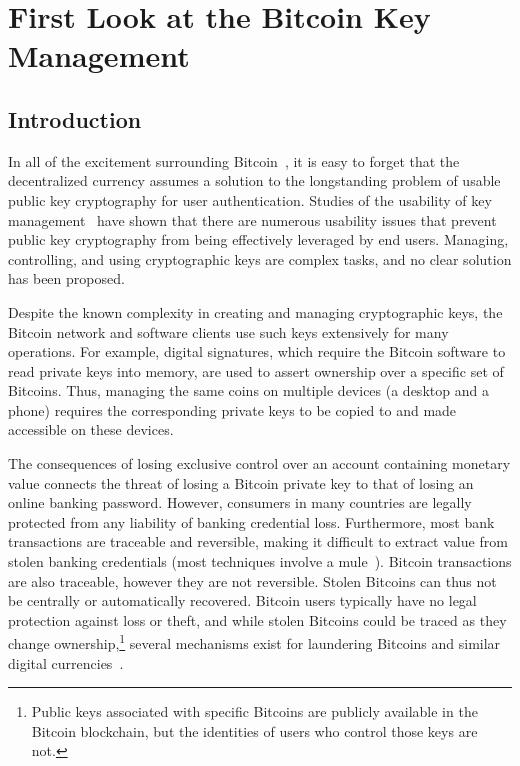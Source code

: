


\chapter{First Look at the Bitcoin Key Management}


\section{Introduction}
In all of the excitement surrounding Bitcoin~\cite{Nak08}, it is easy to forget that the decentralized currency assumes a solution to the longstanding problem of usable public key cryptography for user authentication. Studies of the usability of key management~\cite{GM05,GMSN+05,SBKH06,GFF06} have shown that there are numerous usability issues that prevent public key cryptography from being effectively leveraged by end users. Managing, controlling, and using cryptographic keys are complex tasks, and no clear solution has been proposed.  

Despite the known complexity in creating and managing cryptographic keys, the Bitcoin network and software clients use such keys extensively for many operations. For example, digital signatures, which require the Bitcoin software to read private keys into memory, are used to assert ownership over a specific set of Bitcoins. Thus, managing the same coins on multiple devices (\eg a desktop and a phone) requires the corresponding private keys to be copied to and made accessible on these devices. 


The consequences of losing exclusive control over an account containing monetary value connects the threat of losing a Bitcoin private key to that of losing an online banking password. However, consumers in many countries are legally protected from any liability of banking credential loss. Furthermore, most bank transactions are traceable and reversible, making it difficult to extract value from stolen banking credentials (most techniques involve a mule~\cite{FH12}). Bitcoin transactions are also traceable, however they are not reversible. Stolen Bitcoins can thus not be centrally or automatically recovered. Bitcoin users typically have no legal protection against loss or theft, and while stolen Bitcoins could be traced as they change ownership,\footnote{Public keys associated with specific Bitcoins are publicly available in the Bitcoin blockchain, but the identities of users who control those keys are not.} several mechanisms exist for laundering Bitcoins and similar digital currencies~\cite{MGGR13,BNMC+14}.

